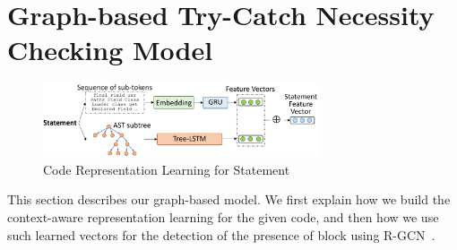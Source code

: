\section{Graph-based Try-Catch Necessity Checking Model}
\label{detect:sec}

\begin{figure}[t]
	\centering
	\includegraphics[width=3.2in]{features.png}
        \vspace{-0.08in}
	\caption{Code Representation Learning for Statement}
	\label{fig:feature}	
\end{figure}

This section describes our graph-based {\xblock} model. We first
explain how we build the context-aware representation learning for the
given code, and then how we use such learned vectors for the detection
of the presence of  block using R-GCN~\cite{yi}.





